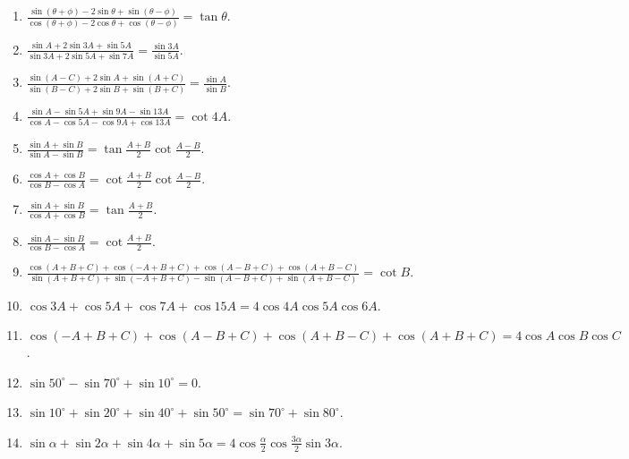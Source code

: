 \begin{enumerate}[resume]
\item $\frac{\sin (\theta + \phi) - 2\sin\theta + \sin (\theta - \phi)}{\cos (\theta + \phi) - 2\cos \theta + \cos(\theta -
    \phi)} = \tan\theta$.

\item $\frac{\sin A + 2\sin 3A + \sin 5A}{\sin 3A + 2\sin 5A + \sin 7A} = \frac{\sin 3A}{\sin 5A}$.

\item $\frac{\sin(A - C) + 2\sin A + \sin(A + C)}{\sin (B - C) + 2\sin B + \sin(B + C)} = \frac{\sin A}{\sin B}$.

\item $\frac{\sin A - \sin 5A + \sin 9A - \sin 13A}{\cos A - \cos 5A - \cos 9A + \cos 13 A} = \cot 4A$.

\item $\frac{\sin A + \sin B}{\sin A - \sin B} = \tan \frac{A + B}{2}\cot \frac{A - B}{2}$.

\item $\frac{\cos A + \cos B}{\cos B - \cos A} = \cot \frac{A + B}{2}\cot \frac{A - B}{2}$.

\item $\frac{\sin A + \sin B}{\cos A + \cos B} = \tan \frac{A + B}{2}$.

\item $\frac{\sin A - \sin B}{\cos B - \cos A} = \cot \frac{A + B}{2}$.

\item $\frac{\cos(A + B + C) + \cos(-A + B + C) + \cos(A - B + C) + \cos(A + B - C)}{\sin(A + B + C)+\sin(-A + B + C) -
    \sin(A - B + C) + \sin(A + B - C)} = \cot B$.

\item $\cos 3A + \cos 5A + \cos 7A + \cos 15A = 4 \cos 4A\cos 5A \cos 6A$.

\item $\cos(-A + B + C) + \cos(A - B + C) + \cos(A + B - C) + \cos(A + B + C) = 4\cos A\cos B\cos C$.

\item $\sin 50^\circ - \sin 70^\circ + \sin 10^\circ = 0$.

\item $\sin 10^\circ + \sin 20^\circ + \sin 40^\circ + \sin 50^\circ = \sin 70^\circ + \sin 80^\circ$.

\item $\sin\alpha + \sin 2\alpha + \sin 4\alpha + \sin 5\alpha = 4\cos \frac{\alpha}{2}\cos \frac{3\alpha}{2}\sin 3\alpha$.
\end{enumerate}

